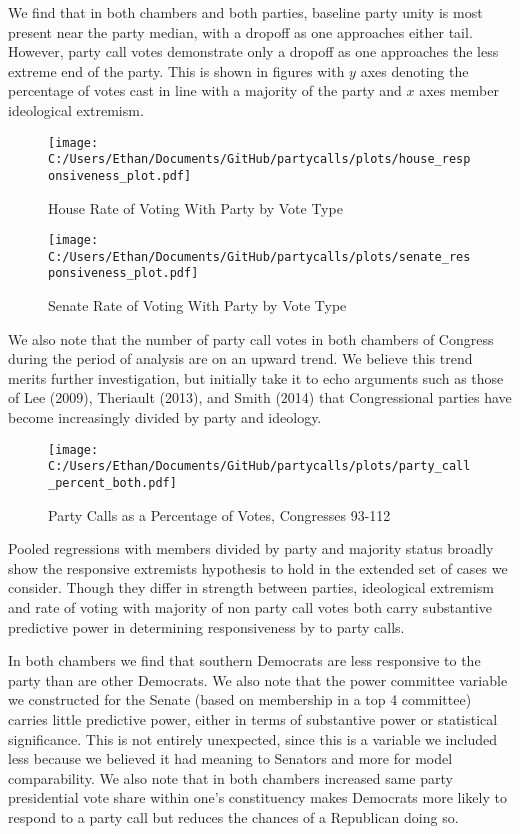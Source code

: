 \documentclass[12pt]{article}
\begin{document}
We find that in both chambers and both parties, baseline party unity is most present near the party median, with a dropoff as one approaches either tail. However, party call votes demonstrate only a dropoff as one approaches the less extreme end of the party. This is shown in figures with $y$ axes denoting the percentage of votes cast in line with a majority of the party and $x$ axes member ideological extremism.

\begin{figure}[H]
	\centering
	\caption{House Rate of Voting With Party by Vote Type}
	\texttt{[image: C:/Users/Ethan/Documents/GitHub/partycalls/plots/house\_responsiveness\_plot.pdf]}
\end{figure}

\begin{figure}[H]
	\centering
	\caption{Senate Rate of Voting With Party by Vote Type}
	\texttt{[image: C:/Users/Ethan/Documents/GitHub/partycalls/plots/senate\_responsiveness\_plot.pdf]}
\end{figure}

We also note that the number of party call votes in both chambers of Congress during the period of analysis are on an upward trend. We believe this trend merits further investigation, but initially take it to echo arguments such as those of Lee (2009), Theriault (2013), and Smith (2014) that Congressional parties have become increasingly divided by party and ideology. 

\begin{figure}[H]
	\centering
	\caption{Party Calls as a Percentage of Votes, Congresses 93-112}
	\texttt{[image: C:/Users/Ethan/Documents/GitHub/partycalls/plots/party\_call\_percent\_both.pdf]}
\end{figure}

Pooled regressions with members divided by party and majority status broadly show the responsive extremists hypothesis to hold in the extended set of cases we consider. Though they differ in strength between parties, ideological extremism and rate of voting with majority of non party call votes both carry substantive predictive power in determining responsiveness by to party calls. 

In both chambers we find that southern Democrats are less responsive to the party than are other Democrats. We also note that the power committee variable we constructed for the Senate (based on membership in a top 4 committee) carries little predictive power, either in terms of substantive power or statistical significance. This is not entirely unexpected, since this is a variable we included less because we believed it had meaning to Senators and more for model comparability. We also note that in both chambers increased same party presidential vote share within one's constituency makes Democrats more likely to respond to a party call but reduces the chances of a Republican doing so.
\end{document}
